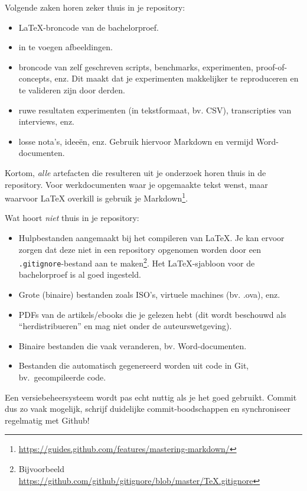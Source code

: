 Volgende zaken horen zeker thuis in je repository:

\begin{itemize}
  \item \LaTeX{}-broncode van de bachelorproef.
  \item in te voegen afbeeldingen.
  \item broncode van zelf geschreven scripts, benchmarks, experimenten, proof-of-concepts, enz. Dit maakt dat je experimenten makkelijker te reproduceren en te valideren zijn door derden.
  \item ruwe resultaten experimenten (in tekstformaat, bv. CSV), transcripties van interviews, enz.
  \item losse nota's, ideeën, enz. Gebruik hiervoor Markdown en vermijd Word-do\-cu\-men\-ten.
\end{itemize}

Kortom, \emph{alle} artefacten die resulteren uit je onderzoek horen thuis in de repository. Voor werkdocumenten waar je opgemaakte tekst wenst, maar waarvoor \LaTeX{} overkill is gebruik je Markdown\footnote{\url{https://guides.github.com/features/mastering-markdown/}}.

Wat hoort \emph{niet} thuis in je repository:

\begin{itemize}
  \item Hulpbestanden aangemaakt bij het compileren van \LaTeX{}. Je kan ervoor zorgen dat deze niet in een repository opgenomen worden door een \texttt{.gitignore}-bestand aan te maken\footnote{Bijvoorbeeld \url{https://github.com/github/gitignore/blob/master/TeX.gitignore}}. Het \LaTeX{}-sjabloon voor de bachelorproef is al goed ingesteld.
  \item Grote (binaire) bestanden zoals ISO's, virtuele machines (bv. .ova), enz.
  \item PDFs van de artikels/ebooks die je gelezen hebt (dit wordt beschouwd als ``herdistribueren'' en mag niet onder de auteurswetgeving).
  \item Binaire bestanden die vaak veranderen, bv. Word-documenten.
  \item Bestanden die automatisch gegenereerd worden uit code in Git, bv.\ gecompileerde code.
\end{itemize}

Een versiebeheersysteem wordt pas echt nuttig als je het goed gebruikt. Commit dus zo vaak mogelijk, schrijf duidelijke commit-boodschappen en synchroniseer regelmatig met Github!

